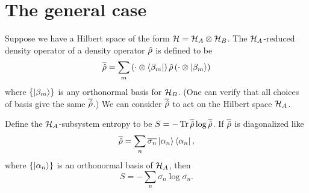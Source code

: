 \section{The general case}

Suppose we have a Hilbert space of the form \(\mathcal{H} = \mathcal{H}_A \otimes \mathcal{H}_B\). The \(\mathcal{H}_A\)-reduced density operator of a density operator \(\hat{\rho}\) is defined to be
\[\overline{\hat{\rho}} = \sum_m \left(\cdot\otimes\left\langle\beta_m\right|\right) \hat{\rho} \left(\cdot\otimes\left|\beta_m\right\rangle\right)\]
where \(\{\left|\beta_m\right\rangle\}\) is any orthonormal basis for \(\mathcal{H}_B\). (One can verify that all choices of basis give the same \(\overline{\hat{\rho}}\).)
We can consider \(\overline{\hat{\rho}}\) to act on the Hilbert space \(\mathcal{H}_A\).

Define the \(\mathcal{H}_A\)-subsystem entropy to be \(S = -\operatorname{Tr} \overline{\hat{\rho}} \log \overline{\hat{\rho}}\). If \(\overline{\hat{\rho}}\) is diagonalized like
\begin{equation}\label{eq.redrhodef}
\overline{\hat{\rho}} = \sum_n \overline{\sigma_n} \left|\alpha_n\right\rangle\left\langle\alpha_n\right|,
\end{equation}
where \(\{\left|\alpha_n\right\rangle\}\) is an orthonormal basis of \(\mathcal{H}_A\), then
\begin{equation}\label{eq.entropydefinition}
S = -\sum_n \overline{\sigma_n} \log \overline{\sigma_n}.
\end{equation}

